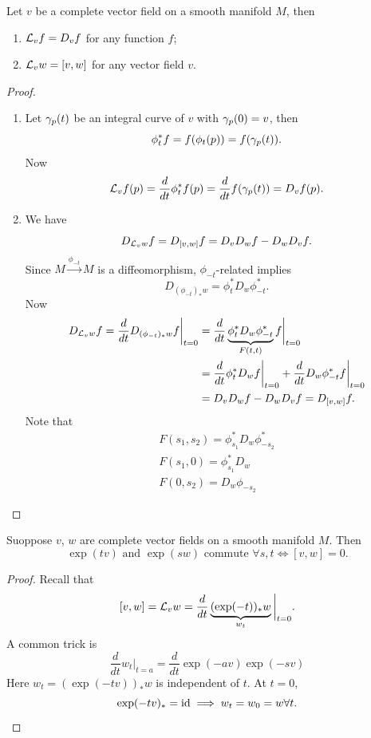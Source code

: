 \begin{theorem}
  Let \(v\) be a complete vector field on a smooth manifold \(M\), then \begin{enumerate}
    \item \(\mathcal{L}_v f = D_v f\) for any function \(f\);
    \item \(\mathcal{L}_v w = [v,w]\) for any vector field \(v\).
  \end{enumerate}
\end{theorem}
\begin{proof}
  \begin{enumerate}
    \item Let \(\gamma_p(t)\) be an integral curve of \(v\) with \(\gamma_p(0) = v\), then \[
      \phi_t^*f = f(\phi_t(p)) = f(\gamma_p(t)).
    \]
    Now \[
      \mathcal{L}_v f(p) = \frac{d}{dt}\phi_t^* f(p) = \frac{d}{dt}f(\gamma_p(t)) = D_v f(p).
    \]
    \item We have \[
      D_{\mathcal{L}_v w}f = D_{[v,w]}f = D_v D_w f - D_w D_v f.
    \]
    Since \(M\xrightarrow{\phi_{-t}}M\) is a diffeomorphism, \(\phi_{-t}\)-related implies \[
      D_{(\phi_{-t})_*w} = \phi_t^*D_w\phi_{-t}^*.
    \]
    Now \begin{align*}
      D_{\mathcal{L}_v w}f = \frac{d}{dt}D_{(\phi_{-t})_*w} f\bigg|_{t=0} 
      &= \frac{d}{dt}\underbrace{\phi_t^*D_w\phi_{-t}^*}_{F(t,t)}f\bigg|_{t=0} \\
      &= \frac{d}{dt}\phi_t^*D_w f\bigg|_{t=0} + \frac{d}{dt}D_w\phi_{-t}^*f\bigg|_{t=0} \\
      &= D_v D_w f - D_w D_v f = D_{[v,w]}f.
    \end{align*}
    Note that \begin{gather*}
      F(s_1,s_2) = \phi_{s_1}^*D_w\phi_{-s_2}^* \\
      F(s_1,0) = \phi_{s_1}^*D_w \\
      F(0,s_2) = D_w\phi_{-s_2}
    \end{gather*}
  \end{enumerate}
\end{proof}

\newpage
\begin{theorem}
  Suoppose \(v\), \(w\) are complete vector fields on a smooth manifold \(M\). Then \[
    \exp(tv) \text{ and } \exp(sw) \text{ commute } \forall s,t
    \iff [v,w] = 0.
  \]
\end{theorem}
\begin{proof}
  Recall that \[
    [v,w] = \mathcal{L}_v w = \frac{d}{dt} \underbrace{(\exp(-t))_* w}_{w_t} \bigg|_{t=0}.
  \]
  A common trick is \[
    \frac{d}{dt}w_t\bigg|_{{t=a}}
    = \frac{d}{dt} \exp(-av)\exp(-sv)
  \]
  Here \(
    w_t = (\exp(-tv))_* w
  \) is independent of \(t\). At \(t = 0\), \[
    \exp(-tv)_* = \mathrm{id} \implies w_t = w_0 = w \forall t.
  \]
\end{proof}

